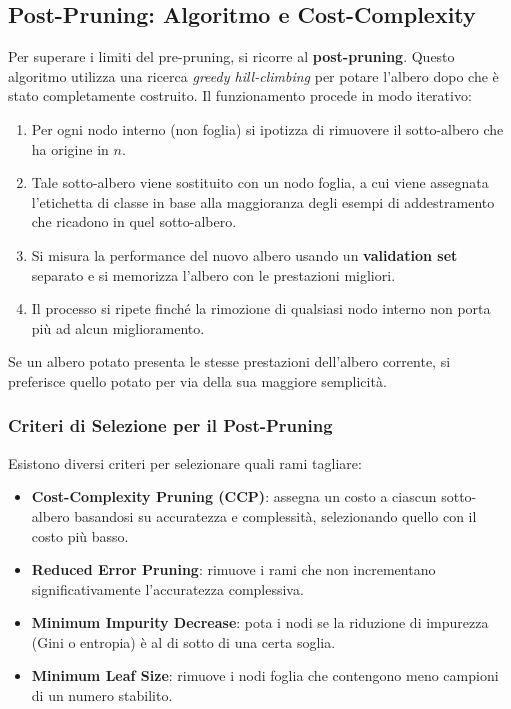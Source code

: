 \subsection{Post-Pruning: Algoritmo e Cost-Complexity}

Per superare i limiti del pre-pruning, si ricorre al
\textbf{post-pruning}. Questo algoritmo utilizza una
ricerca \textit{greedy hill-climbing} per potare l'albero
dopo che è stato completamente costruito. Il funzionamento
procede in modo iterativo:

\begin{enumerate}
    \item Per ogni nodo interno (non foglia) si ipotizza
        di rimuovere il sotto-albero che ha origine in $n$.
    \item Tale sotto-albero viene sostituito con un nodo
        foglia, a cui viene assegnata l'etichetta di classe
        in base alla maggioranza degli esempi di
        addestramento che ricadono in quel sotto-albero.
    \item Si misura la performance del nuovo albero
        usando un \textbf{validation set} separato e
        si memorizza l'albero con le prestazioni migliori.
    \item Il processo si ripete finché la rimozione di
        qualsiasi nodo interno non porta più ad alcun
        miglioramento.
\end{enumerate}

Se un albero potato presenta le stesse prestazioni
dell'albero corrente, si preferisce quello potato per
via della sua maggiore semplicità.

\subsubsection{Criteri di Selezione per il Post-Pruning}

Esistono diversi criteri per selezionare quali rami tagliare:

\begin{itemize}
    \item \textbf{Cost-Complexity Pruning (CCP)}: assegna
        un costo a ciascun sotto-albero basandosi su
        accuratezza e complessità, selezionando quello
        con il costo più basso.
    \item \textbf{Reduced Error Pruning}: rimuove i rami
        che non incrementano significativamente
        l'accuratezza complessiva.
    \item \textbf{Minimum Impurity Decrease}: pota i nodi
        se la riduzione di impurezza (Gini o entropia)
        è al di sotto di una certa soglia.
    \item \textbf{Minimum Leaf Size}: rimuove i nodi
        foglia che contengono meno campioni di un
        numero stabilito.
\end{itemize}

